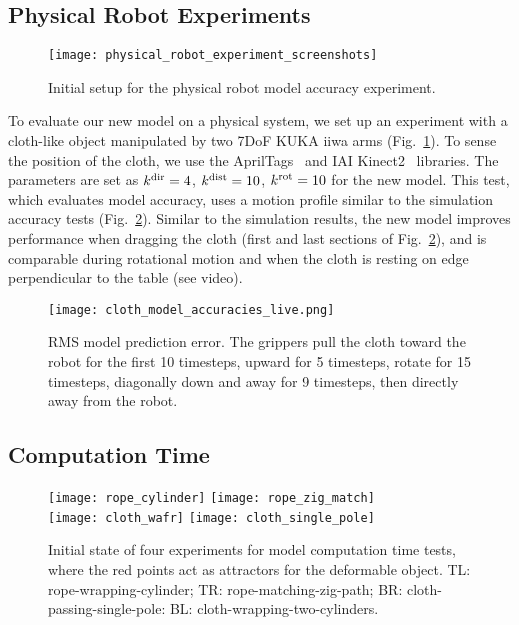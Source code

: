 \subsection{Physical Robot Experiments}

\begin{figure}[ht]
    \centering
    \texttt{[image: physical\_robot\_experiment\_screenshots]}
    \caption{Initial setup for the physical robot model accuracy experiment.}
    \label{fig:physical_experiment_screenshots}
\end{figure}

To evaluate our new model on a physical system, we set up an experiment with a cloth-like object manipulated by two 7DoF KUKA iiwa arms (Fig.~\ref{fig:physical_experiment_screenshots}). To sense the position of the cloth, we use the AprilTags~\cite{olson2011tags} and IAI Kinect2~\cite{iai_kinect2} libraries. The parameters are set as $k^\textrm{dir} = 4$, $k^\textrm{dist} = 10$, $k^{\textrm{rot}} = 10$ for the new model. This test, which evaluates model accuracy, uses a motion profile similar to the simulation accuracy tests (Fig.~\ref{fig:cloth_model_accuracies_live}). Similar to the simulation results, the new model improves performance when dragging the cloth (first and last sections of Fig.~\ref{fig:cloth_model_accuracies_live}), and is comparable during rotational motion and when the cloth is resting on edge perpendicular to the table (see video).

\begin{figure}[ht]
    \centering
    \texttt{[image: cloth\_model\_accuracies\_live.png]}
    \caption{RMS model prediction error. The grippers pull the cloth toward the robot for the first 10 timesteps, upward for 5 timesteps, rotate for 15 timesteps, diagonally down and away for 9 timesteps, then directly away from the robot.}
    \label{fig:cloth_model_accuracies_live}
\end{figure}

\subsection{Computation Time}

\begin{figure}[t]
    \centering
    \texttt{[image: rope\_cylinder]}\hfill
    \texttt{[image: rope\_zig\_match]}\\
    \texttt{[image: cloth\_wafr]}\hfill
    \texttt{[image: cloth\_single\_pole]}%
    \caption{Initial state of four experiments for model computation time tests, where the red points act as attractors for the deformable object. TL: rope-wrapping-cylinder; TR: rope-matching-zig-path; BR: cloth-passing-single-pole: BL: cloth-wrapping-two-cylinders.}
    \label{fig:modelling_timing_tests}
\end{figure}


